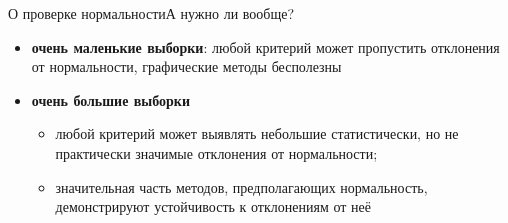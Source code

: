 \documentclass[11pt,pdf,utf8,hyperref={unicode},aspectratio=169]{beamer}
\begin{document}
\begin{frame}{О проверке нормальности}{А нужно ли вообще?}

\large
\begin{itemize}

    \item \textbf{очень маленькие выборки}: любой критерий может пропустить отклонения от нормальности, графические методы бесполезны
\bigskip
\item \textbf{очень большие выборки}
    \begin{itemize}
        \item любой критерий может выявлять небольшие статистически, но не практически значимые отклонения от нормальности;
        \item значительная часть методов, предполагающих нормальность, демонстрируют устойчивость к отклонениям от неё
    \end{itemize}
\end{itemize}
\end{frame}
\end{document}
